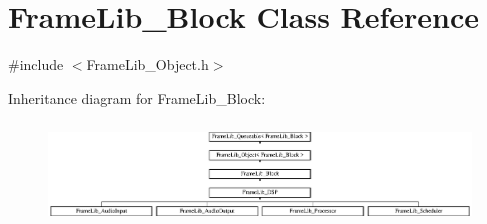 \hypertarget{class_frame_lib___block}{}\section{Frame\+Lib\+\_\+\+Block Class Reference}
\label{class_frame_lib___block}


{\ttfamily \#include $<$Frame\+Lib\+\_\+\+Object.\+h$>$}

Inheritance diagram for Frame\+Lib\+\_\+\+Block\+:\begin{figure}[H]
\begin{center}
\leavevmode
\includegraphics[height=2.723735cm]{class_frame_lib___block}
\end{center}
\end{figure}
